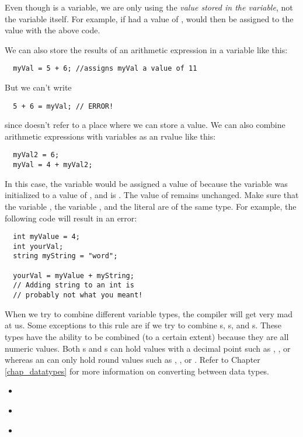 Even though  is a variable, we are only using the \textit{value stored in the variable}, not the variable itself. 
For example, if  had a value of ,  would then be assigned to the value  with the above code. 

We can also store the results of an arithmetic expression in a variable like this: 

\begin{lstlisting}
  myVal = 5 + 6; //assigns myVal a value of 11
\end{lstlisting}

But we can't write
\begin{lstlisting}
  5 + 6 = myVal; // ERROR!
\end{lstlisting}

\noindent since  doesn't refer to a place where we can store a value. 
We can also combine arithmetic expressions with variables as an rvalue like this:

\begin{lstlisting}
  myVal2 = 6;
  myVal = 4 + myVal2;
\end{lstlisting}

In this case, the variable  would be assigned a value of  because the variable  was initialized to a value of , and  is .
The value of  remains unchanged. 
Make sure that the variable , the variable , and the literal  are of the same type. 
For example, the following code will result in an error:

\begin{lstlisting}
  int myValue = 4;
  int yourVal;
  string myString = "word";
		
  yourVal = myValue + myString; 
  // Adding string to an int is
  // probably not what you meant!
\end{lstlisting}

When we try to combine different variable types, the compiler will get very mad at us. 
Some exceptions to this rule are if we try to combine s, s, and s.
These types have the ability to be combined (to a certain extent) because they are all numeric values.
Both s and s can hold values with a decimal point such as , , or  whereas an  can only hold round values such as , , or . Refer to Chapter \ref{chap_datatypes} for more information on converting between data types.








\begin{itemize}
\item ~
\item ~
\item ~
\end{itemize}	

